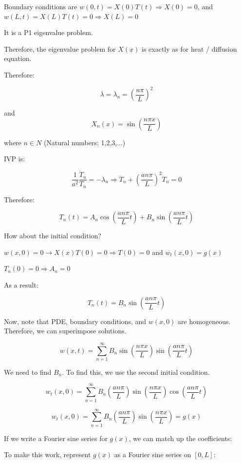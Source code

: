 Boundary conditions are $w(0,t) = X(0) T(t) \Rightarrow X(0) = 0$, and $w(L,t) = X(L) T(t) = 0 \Rightarrow X(L) = 0$

It is a P1 eigenvalue problem. 

Therefore, the eigenvalue problem for $X(x)$ is exactly as for heat / diffusion equation. 

Therefore:

$$\lambda = \lambda_n = \left( \frac{n \pi}{L} \right)^2$$

and $$X_n (x) = \sin \left(\frac{n \pi x}{L} \right)$$

where $n \in N$ (Natural numbers; 1,2,3,...)

IVP is:

$$\frac{1}{a^2} \frac{\ddot{T}_n}{T_n} = -\lambda_n \Rightarrow \ddot{T}_n + \left( \frac{a n \pi}{L} \right)^2 T_n = 0$$

Therefore:

$$T_n(t) = A_n \cos \left(\frac{a n \pi}{L} t \right) + B_n \sin \left(\frac{a n \pi}{L} t \right)$$

How about the initial condition?

$w(x,0) = 0 \longrightarrow X(x) T(0) = 0 \Rightarrow T(0) = 0$ and $w_t (x,0) = g(x)$

$T_n (0) = 0 \Rightarrow A_n = 0$

\hfill

As a result:

$$T_n(t) = B_n \sin \left(\frac{a n \pi}{L} t \right)$$

Now, note that PDE, boundary conditions, and $w(x,0)$ are homogeneous. Therefore, we can superimpose solutions. 

$$w(x,t) = \sum_{n = 1}^\infty B_n \sin \left(\frac{n \pi x}{L} \right) \sin \left(\frac{a n \pi}{L} t \right)$$

We need to find $B_n$. To find this, we use the second initial condition. 

$$w_t (x,0) = \sum_{n = 1}^\infty B_n \left(\frac{a n \pi}{L} \right)  \sin \left(\frac{n \pi x}{L} \right) \cos \left(\frac{a n \pi}{L} t \right)$$

$$w_t (x,0) = \sum_{n = 1}^\infty B_n \left(\frac{a n \pi}{L} \right) \sin \left( \frac{n \pi x}{L} \right) = g(x)$$

If we write a Fourier sine series for $g(x)$, we can match up the coefficients:

To make this work, represent $g(x)$ as a Fourier sine series on $\left[ 0, L \right]$:

